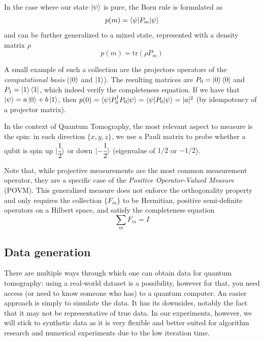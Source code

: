 \documentclass[12pt]{memoir}
\newcommand{\tr}{\text{tr}}
\begin{document}
In the case where our state $\ket \psi$ is pure, the Born rule is formulated as
\begin{equation}
    p(m) = \braket{\psi|P_m|\psi}
\end{equation}
and can be further generalized to a mixed state, represented with a density matrix $\rho$
\begin{equation}\label{eq:quantum-measurement}
    p(m) = \tr(\rho P_m)
\end{equation}

A small example of such a collection are the projectors operators of the \textit{computational basis} ($\ket 0$ and $\ket 1$). The resulting matrices are $P_0 = \ket 0 \bra 0$ and $P_1 = \ket 1 \bra 1$, which indeed verify the completeness equation. If we have that $\ket \psi = a \ket 0 + b \ket 1$, then $p(0) = \braket{\psi|P_0^\dagger P_0|\psi} = \braket{\psi|P_0|\psi} = |a|^2$ (by idempotency of a projector matrix).\medbreak
    
In the context of Quantum Tomography, the most relevant aspect to measure is the spin: in each direction $\{x,y,z\}$, we use a Pauli matrix to probe whether a qubit is spin up $\ket{\cfrac{1}{2}}$ or down $\ket{-\cfrac{1}{2}}$ (eigenvalue of $1/2$ or $-1/2$)\cite{book:Nielsen-Chuang-2010,wiki:born-rule}. \medbreak

Note that, while projective measurements are the most common measurement operator, they are a specific case of the \textit{Positive Operator-Valued Measure} (POVM). This generalized measure does not enforce the orthogonality property and only requires the collection $\{F_m\}$ to be Hermitian, positive semi-definite operators on a Hilbert space, and satisfy the completeness equation
\begin{equation}
    \sum_m F_m = I
\end{equation}


\subsection{Data generation}
There are multiple ways through which one can obtain data for quantum tomography: using a real-world dataset is a possibility, however for that, you need access (or need to know someone who has) to a quantum computer. An easier approach is simply to simulate the data. It has its downsides, notably the fact that it may not be representative of true data. In our experiments, however, we will stick to synthetic data as it is very flexible and better suited for algorithm research and numerical experiments due to the low iteration time.\medbreak
\end{document}
